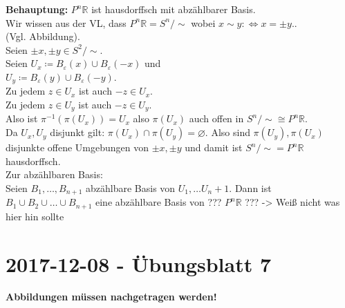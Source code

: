 \begin{problem*}[3b]
\textbf{Behauptung:} $ P^n\mathbb{R}$ ist hausdorffsch mit abzählbarer Basis.\\
Wir wissen aus der VL, dass $ P^n\mathbb{R} = S^n / \sim $ wobei $x \sim y :\Leftrightarrow x = \pm y.$.\\
(Vgl. Abbildung). \\
Seien $\pm x, \pm y \in S^2 / \sim $. \\
Seien $U_x \coloneqq B_\varepsilon(x) \cup B_\varepsilon(-x)$ und \\
$U_y \coloneqq B_\varepsilon(y) \cup B_\varepsilon(-y)$.\\
Zu jedem $ z \in U_x$ ist auch $-z \in U_x$.\\
Zu jedem $ z \in U_y$ ist auch $-z \in U_y$.\\
Also ist $\pi^{ -1 } (\pi(U_x)) = U_x$ also $\pi(U_x)$ auch offen in $S^n / \sim \cong P^n\mathbb{R} $.\\
Da $U_x, U_y$ disjunkt gilt: $\pi(U_x) \cap \pi(U_y) = \varnothing$. Also sind $\pi(U_y), \pi(U_x)$ disjunkte offene Umgebungen von $\pm x, \pm y$ und damit ist $S^n / \sim = P^n\mathbb{R} $ hausdorffsch.\\
Zur abzählbaren Basis: \\
Seien $B_1, \dots, B_{ n+1 }$ abzählbare Basis von $U_1, \dots U_n+1$. Dann ist $ B_1 \cup B_2 \cup \dots \cup B_{ n+1 }$ eine abzählbare Basis von ??? $P^n\mathbb{R}$ ??? -> Weiß nicht was hier hin sollte



\end{problem*}

\newpage
\section{2017-12-08 - Übungsblatt 7} %
\label{sub:2017_12_08}

\textbf{Abbildungen müssen nachgetragen werden!}

